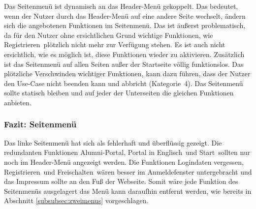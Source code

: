 {Das Seitenmenü ist dynamisch an das Header-Menü gekoppelt. Das bedeutet, wenn der Nutzer durch das Header-Menü auf eine andere Seite wechselt, ändern sich die angebotenen Funktionen im Seitenmenü. Das ist äußerst problematisch, da für den Nutzer ohne ersichtlichen Grund wichtige Funktionen, wie \glqq Registrieren\grqq~plötzlich nicht mehr zur Verfügung stehen. Es ist auch nicht ersichtlich, wie es möglich ist, diese Funktionen wieder zu aktivieren.
Zusätzlich ist das Seitenmenü auf allen Seiten außer der Startseite völlig funktionslos. 
}
{Das plötzliche Verschwinden wichtiger Funktionen, kann dazu führen, dass der Nutzer den Use-Case nicht beenden kann und abbricht (Kategorie~4).
}
{Das Seitenmenü sollte statisch bleiben und auf jeder der Unterseiten die gleichen Funktionen anbieten.
}

\subsubsection*{Fazit: Seitenmenü}
Das linke Seitenmenü hat sich als fehlerhaft und überflüssig gezeigt. 
Die redundanten Funktionen \glqq Alumni-Portal\grqq, \glqq Portal in Englisch\grqq~und \glqq Start\grqq~sollten nur noch im Header-Menü angezeigt werden. Die Funktionen \glqq Logindaten vergessen\grqq, \glqq Registrieren\grqq~und \glqq Freischalten\grqq~wären besser im Anmeldefenster untergebracht und das Impressum sollte an den Fuß der Webseite.
Somit wäre jede Funktion des Seitenmenüs ausgelagert das Menü kann daraufhin entfernt werden, wie bereits in Abschnitt \ref{subsubsec:zweimenus} vorgeschlagen.
